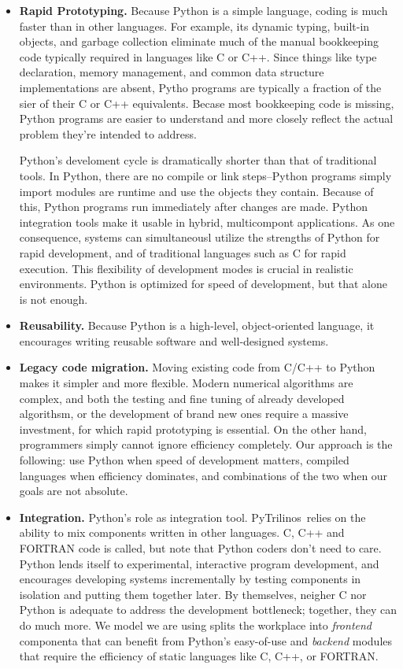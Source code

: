 \documentclass[10pt,relax]{SANDreport}
\newcommand{\PyTrilinos}{{PyTrilinos}}
\begin{document}
\begin{itemize}
\item {\bf Rapid Prototyping.}
Because Python is a simple language, coding is much faster than in other
  languages. For example, its dynamic typing, built-in objects, and garbage
  collection eliminate much of the manual bookkeeping code typically required
  in languages like C or C++. Since things like type declaration, memory
  management, and common data structure implementations are absent, Pytho
  programs are typically a fraction of the sier of their C or C++ equivalents.
  Becase most bookkeeping code is missing, Python programs are easier to
  understand and more closely reflect the actual problem they're intended to
  address. 

  Python's
  develoment cycle is dramatically shorter than that of traditional tools. In
  Python, there are no compile or link steps--Python programs simply import
  modules are runtime and use the objects they contain. Because of this,
Python programs run immediately after changes are made. Python integration
  tools make it usable in hybrid, multicompont applications. As one
  consequence, systems can simultaneousl utilize the strengths of Python for
  rapid development, and of traditional languages such as C for rapid
  execution.
  This flexibility of development modes is crucial in realistic environments.
  Python is optimized for speed of development, but that alone is not enough.
%
\item {\bf Reusability.} Because Python is a high-level, object-oriented
language, it encourages writing reusable software and well-designed systems.
%
\item {\bf Legacy code migration.} Moving existing code from C/C++ to Python
makes it simpler and more flexible.
Modern numerical
algorithms are complex, and both the testing and fine tuning of already
developed algorithsm, or the development of brand new ones require a massive
investment, for which rapid prototyping is essential. On the other hand,
programmers simply cannot ignore efficiency completely. Our approach is the
following: use Python when speed of development matters, compiled languages
when efficiency dominates, and combinations of the two when our goals are
not absolute.
%
\item {\bf Integration.} Python's role as integration tool. \PyTrilinos\ relies
on the ability to mix components written in other languages. C, C++ and
FORTRAN code is called, but note that Python coders don't need to care.
  Python lends itself to experimental, interactive program development, and
  encourages developing systems incrementally by testing components in
  isolation and putting them together later.
  By themselves, neigher C nor Python is adequate to address the development
  bottleneck; together, they can do much more. We model we are using splits
  the workplace into {\sl frontend} componenta that can benefit from Python's
  easy-of-use and {\sl backend} modules that require the efficiency of static
  languages like C, C++, or FORTRAN.
%
\end{itemize}
\end{document}
